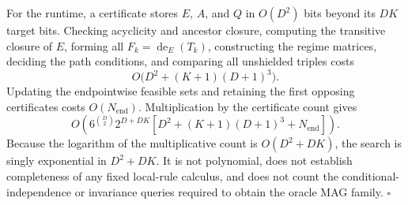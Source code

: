 For the runtime, a certificate stores \(E\), \(A\), and \(Q\) in \(O(D^2)\) bits beyond its \(DK\) target bits.  Checking acyclicity and ancestor closure, computing the transitive closure of \(E\), forming all \(F_k=\operatorname{de}_E(T_k)\), constructing the regime matrices, deciding the path conditions, and comparing all unshielded triples costs
\[
O\bigl(D^2+(K+1)(D+1)^3\bigr).
\]
Updating the endpointwise feasible sets and retaining the first opposing certificates costs \(O(N_{\mathrm{end}})\).  Multiplication by the certificate count gives
\[
O\!\left(
6^{\binom D2}2^{D+DK}
\left[D^2+(K+1)(D+1)^3+N_{\mathrm{end}}\right]
\right).
\]
Because the logarithm of the multiplicative count is \(O(D^2+DK)\), the search is singly exponential in \(D^2+DK\).  It is not polynomial, does not establish completeness of any fixed local-rule calculus, and does not count the conditional-independence or invariance queries required to obtain the oracle MAG family. \(\square\)
